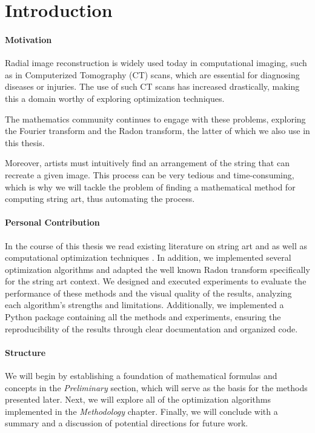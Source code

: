 \chapter{Introduction}

\subsubsection{Motivation}
 
Radial image reconstruction is widely used today in computational imaging, such as in Computerized Tomography (CT) scans, which are essential for diagnosing diseases or injuries. The use of such CT scans has increased drastically, making this a domain worthy of exploring optimization techniques.

The mathematics community continues to engage with these problems, exploring the Fourier transform and the Radon transform, the latter of which we also use in this thesis.

Moreover, artists must intuitively find an arrangement of the string that can recreate a given image. This process can be very tedious and time-consuming, which is why we will tackle the problem of finding a mathematical method for computing string art, thus automating the process.

\subsubsection{Personal Contribution}

In the course of this thesis we read existing literature on string art \cite{towards-computational-stringart} and \cite{computational-stringart} as well as computational optimization techniques \cite{convex-optimization}. In addition, we implemented several optimization algorithms and adapted the well known Radon transform specifically for the string art context. We designed and executed experiments to evaluate the performance of these methods and the visual quality of the results, analyzing each algorithm's strengths and limitations. Additionally, we implemented a Python package containing all the methods and experiments, ensuring the reproducibility of the results through clear documentation and organized code.

\subsubsection{Structure}

We will begin by establishing a foundation of mathematical formulas and concepts in the \textit{Preliminary} section, which will serve as the basis for the methods presented later. Next, we will explore all of the optimization algorithms implemented in the \textit{Methodology} chapter. Finally, we will conclude with a summary and a discussion of potential directions for future work.

